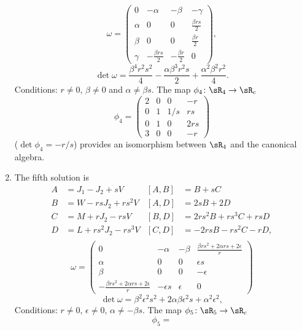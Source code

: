\begin{enumerate}
\begin{equation}
\omega=\begin{pmatrix}
0   &-\alpha        &-\beta &-\gamma\\
\alpha  &0          &0  &\frac{ \beta r s  }{ 2 }\\
\beta   &0          &0  &\frac{ \beta r }{2}\\
\gamma  &-\frac{ \beta r s  }{ 2 }  &-\frac{ \beta r }{2}   &0
\end{pmatrix},
\end{equation}
\[
\det\omega=\frac{ \beta^{4}r^{2}s^{2} }{ 4 }-\frac{ \alpha\beta^{3}r^{2}s }{ 2 }+\frac{ \alpha^{2}\beta^{2}r^{2} }{ 4 }.
\]
Conditions:  $r\neq 0$, $\beta\neq 0$ and $\alpha\neq\beta s$.  The map $\phi_4\colon \sR_4\to \sR_c$
\[
  \phi_{4}=
\begin{pmatrix}
2&0&0&-r\\
0&1&1/s&rs\\
0&1&0&2rs\\
3&0&0&-r
\end{pmatrix}
\]
($\det\phi_4=-r/s$)  provides an isomorphism between $\sR_{4}$ and the canonical algebra.
\item The fifth solution is
\begin{align*}
A&=J_{1}-J_{2}+sV       &[A,B]&=B+sC\\
B&=W-rsJ_{2}+rs^{2}V        &[A,D]&=2sB+2D\\
C&=M+rJ_{2}-rsV         &[B,D]&=2rs^{2}B+rs^{3}C+rsD\\
D&=L+rs^{2}J_{2}-rs^{3}V    &[C,D]&=-2rsB-rs^{2}C-rD,\\
\end{align*}
\begin{equation}
\omega=\begin{pmatrix}
0&-\alpha&-\beta&\frac{ \beta r s^{2}+2\alpha r s+2\epsilon }{ r }\\
\alpha&0&0&\epsilon s\\
\beta&0&0&-\epsilon\\
-\frac{ \beta r s^{2}+2\alpha r s+2\epsilon }{ r }&-\epsilon s&\epsilon&0
\end{pmatrix}
\end{equation}
\begin{equation}
\det\omega=\beta^{2}\epsilon^{2}s^{2}+2\alpha\beta\epsilon^{2}s+\alpha^{2}\epsilon^{2},
\end{equation}
Conditions:  $r\neq 0$, $\epsilon\neq 0$, $\alpha\neq -\beta s$.  The map $\phi_5\colon \sR_5\to \sR_c$
\begin{equation}
\phi_{5}=

\end{equation}
\end{enumerate}
